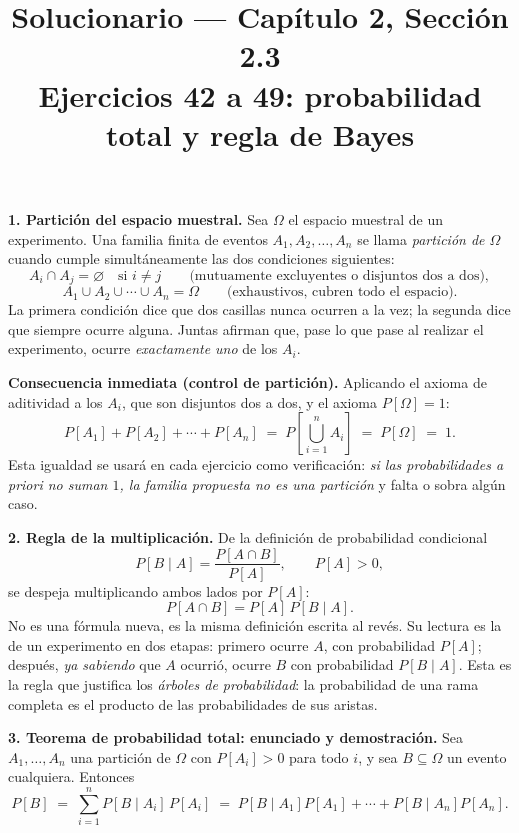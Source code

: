 \documentclass[11pt]{article}
\title{Solucionario --- Cap\'itulo 2, Secci\'on 2.3\\ Ejercicios 42 a 49: probabilidad total y regla de Bayes}
\author{}
\date{}
\begin{document}
\maketitle

\begin{teo}
\textbf{1. Partici\'on del espacio muestral.}
Sea $\Omega$ el espacio muestral de un experimento. Una familia finita de eventos $A_1,A_2,\dots,A_n$ se llama \emph{partici\'on de $\Omega$} cuando cumple simult\'aneamente las dos condiciones siguientes:
\[
A_i\cap A_j=\varnothing \quad\text{si } i\neq j
\qquad\text{(mutuamente excluyentes o disjuntos dos a dos)},
\]
\[
A_1\cup A_2\cup\cdots\cup A_n=\Omega
\qquad\text{(exhaustivos, cubren todo el espacio)}.
\]
La primera condici\'on dice que dos casillas nunca ocurren a la vez; la segunda dice que siempre ocurre alguna. Juntas afirman que, pase lo que pase al realizar el experimento, ocurre \emph{exactamente uno} de los $A_i$.

\medskip
\textbf{Consecuencia inmediata (control de partici\'on).} Aplicando el axioma de aditividad a los $A_i$, que son disjuntos dos a dos, y el axioma $P[\Omega]=1$:
\[
P[A_1]+P[A_2]+\cdots+P[A_n]\;=\;P\!\left[\bigcup_{i=1}^{n}A_i\right]\;=\;P[\Omega]\;=\;1 .
\]
Esta igualdad se usar\'a en cada ejercicio como verificaci\'on: \emph{si las probabilidades a priori no suman $1$, la familia propuesta no es una partici\'on} y falta o sobra alg\'un caso.

\medskip
\textbf{2. Regla de la multiplicaci\'on.}
De la definici\'on de probabilidad condicional
\[
P[B\mid A]=\frac{P[A\cap B]}{P[A]}, \qquad P[A]>0,
\]
se despeja multiplicando ambos lados por $P[A]$:
\[
P[A\cap B]=P[A]\,P[B\mid A].
\]
No es una f\'ormula nueva, es la misma definici\'on escrita al rev\'es. Su lectura es la de un experimento en dos etapas: primero ocurre $A$, con probabilidad $P[A]$; despu\'es, \emph{ya sabiendo} que $A$ ocurri\'o, ocurre $B$ con probabilidad $P[B\mid A]$. Esta es la regla que justifica los \emph{\'arboles de probabilidad}: la probabilidad de una rama completa es el producto de las probabilidades de sus aristas.

\medskip
\textbf{3. Teorema de probabilidad total: enunciado y demostraci\'on.}
Sea $A_1,\dots,A_n$ una partici\'on de $\Omega$ con $P[A_i]>0$ para todo $i$, y sea $B\subseteq\Omega$ un evento cualquiera. Entonces
\[
P[B]\;=\;\sum_{i=1}^{n}P[B\mid A_i]\,P[A_i]\;=\;P[B\mid A_1]P[A_1]+\cdots+P[B\mid A_n]P[A_n].
\]


\end{teo}
\end{document}
